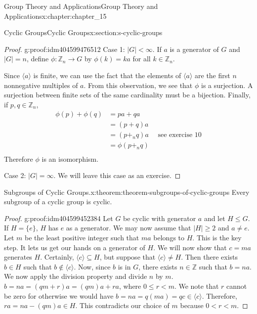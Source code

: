\documentclass[twoside,10pt,]{book}
\numberwithin{equation}{section}
\begin{document}
\begin{chapterptx}{Group Theory and Applications}{}{Group Theory and Applications}{}{}{x:chapter:chapter_15}
\begin{sectionptx}{Cyclic Groups}{}{Cyclic Groups}{}{}{x:section:s-cyclic-groups}
\begin{proof}{}{g:proof:idm404599476512}
Case 1: \(\lvert G\rvert < \infty\). If \(a\) is a generator of \(G\) and \(\lvert G\rvert =n\), define \(\phi:\mathbb{Z}_n \to  G\) by \(\phi(k) = k a\) for all \(k \in \mathbb{Z}_n\).%
\par
Since \(\langle a \rangle\) is finite, we can use the fact that the elements of \(\langle a \rangle\) are the first \(n\) nonnegative multiples of \(a\). From this observation, we see that \(\phi\) is a surjection. A surjection between finite sets of the same cardinality must be a bijection. Finally, if \(p,q \in  \mathbb{Z}_n\),%
\begin{equation*}
\begin{split}
\phi(p)+\phi(q) &= p a + q a\\
&= (p+q)a \\
&= (p +_n q)a \quad \textrm{     see exercise 10}\\
& = \phi(p +_n q)\\ 
\end{split}
\end{equation*}
Therefore \(\phi\) is an isomorphism.%
\par
Case 2: \(\lvert G\rvert =\infty\). We will leave this case as an exercise.%
\end{proof}
\begin{theorem}{Subgroups of Cyclic Groups.}{}{x:theorem:theorem-subgroups-of-cyclic-groups}%
Every subgroup of a cyclic group is cyclic.%
\end{theorem}
\begin{proof}{}{g:proof:idm404599452384}
Let \(G\) be cyclic with generator \(a\) and let \(H \leq  G\). If \(H = \{e\}\), \(H\) has \(e\) as a generator.  We may now assume that \(\lvert H\rvert \geq 2\) and \(a \neq  e\). Let \(m\) be the least positive integer such that \(m a\) belongs to \(H\). This is the key step. It lets us get our hands on a generator of \(H\). We will now show that \(c= m a\) generates \(H\).  Certainly, \(\langle c \rangle \subseteq  H\), but suppose that \(\langle c \rangle \neq  H\). Then there exists \(b \in  H\) such that \(b \notin  \langle c \rangle\). Now, since \(b\) is in \(G\), there exists \(n \in
\mathbb{Z}\) such that \(b = n a\). We now apply the division property and divide \(n\) by \(m\). \(b = n a = (q m+r)a = (q m)a+r a\), where \(0 \leq r < m\).  We note that \(r\) cannot be zero for otherwise we would have  \(b = n a = q(m a) = q c \in  \langle c \rangle\).   Therefore, \(r a = n a - (q m) a \in  H\).  This contradicts our choice of \(m\) because \(0 < r < m\).%

\end{proof}
\end{sectionptx}
\end{chapterptx}
\end{document}
